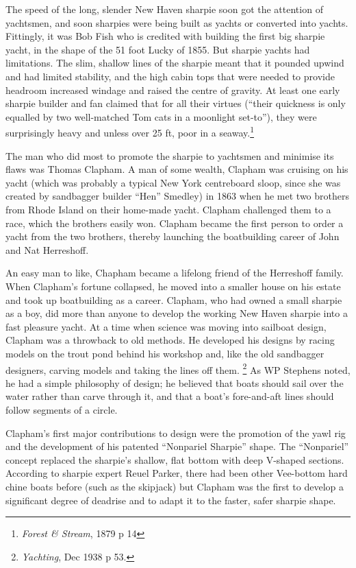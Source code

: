 \documentclass[
  letterpaper,
]{scrbook}
\begin{document}
The speed of the long, slender New Haven sharpie soon got the attention
of yachtsmen, and soon sharpies were being built as yachts or converted
into yachts. Fittingly, it was Bob Fish who is credited with building
the first big sharpie yacht, in the shape of the 51 foot Lucky of 1855.
But sharpie yachts had limitations. The slim, shallow lines of the
sharpie meant that it pounded upwind and had limited stability, and the
high cabin tops that were needed to provide headroom increased windage
and raised the centre of gravity. At least one early sharpie builder and
fan claimed that for all their virtues (``their quickness is only
equalled by two well-matched Tom cats in a moonlight set-to''), they
were surprisingly heavy and unless over 25 ft, poor in a
seaway.\footnote{\emph{Forest \& Stream}, 1879 p 14}

The man who did most to promote the sharpie to yachtsmen and minimise
its flaws was Thomas Clapham. A man of some wealth, Clapham was cruising
on his yacht (which was probably a typical New York centreboard sloop,
since she was created by sandbagger builder ``Hen'' Smedley) in 1863
when he met two brothers from Rhode Island on their home-made yacht.
Clapham challenged them to a race, which the brothers easily won.
Clapham became the first person to order a yacht from the two brothers,
thereby launching the boatbuilding career of John and Nat Herreshoff.

An easy man to like, Chapham became a lifelong friend of the Herreshoff
family. When Clapham's fortune collapsed, he moved into a smaller house
on his estate and took up boatbuilding as a career. Clapham, who had
owned a small sharpie as a boy, did more than anyone to develop the
working New Haven sharpie into a fast pleasure yacht. At a time when
science was moving into sailboat design, Clapham was a throwback to old
methods. He developed his designs by racing models on the trout pond
behind his workshop and, like the old sandbagger designers, carving
models and taking the lines off them. \footnote{\emph{Yachting}, Dec
  1938 p 53.} As WP Stephens noted, he had a simple philosophy of
design; he believed that boats should sail over the water rather than
carve through it, and that a boat's fore-and-aft lines should follow
segments of a circle.

Clapham's first major contributions to design were the promotion of the
yawl rig and the development of his patented ``Nonpariel Sharpie''
shape. The ``Nonpariel'' concept replaced the sharpie's shallow, flat
bottom with deep V-shaped sections. According to sharpie expert Reuel
Parker, there had been other Vee-bottom hard chine boats before (such as
the skipjack) but Clapham was the first to develop a significant degree
of deadrise and to adapt it to the faster, safer sharpie shape.
\end{document}
